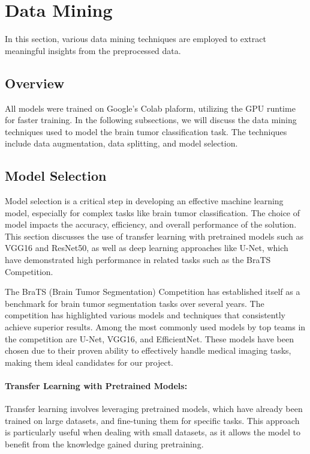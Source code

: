 \section{Data Mining}\label{data_mining}

In this section, various data mining techniques are employed to extract meaningful insights from the preprocessed data.

\subsection{Overview}\label{overview}

All models were trained on Google's Colab plaform, utilizing the GPU runtime for faster training. In the following subsections, we will discuss the data mining techniques used to model the brain tumor classification task. The techniques include data augmentation, data splitting, and model selection.

\subsection{Model Selection}\label{model_selection}

Model selection is a critical step in developing an effective machine learning model, especially for complex tasks like brain tumor classification. The choice of model impacts the accuracy, efficiency, and overall performance of the solution. This section discusses the use of transfer learning with pretrained models such as VGG16 and ResNet50, as well as deep learning approaches like U-Net, which have demonstrated high performance in related tasks such as the BraTS Competition.

The BraTS (Brain Tumor Segmentation) Competition has established itself as a benchmark for brain tumor segmentation tasks over several years. The competition has highlighted various models and techniques that consistently achieve superior results. Among the most commonly used models by top teams in the competition are U-Net, VGG16, and EfficientNet. These models have been chosen due to their proven ability to effectively handle medical imaging tasks, making them ideal candidates for our project.

\paragraph{Transfer Learning with Pretrained Models:}
Transfer learning involves leveraging pretrained models, which have already been trained on large datasets, and fine-tuning them for specific tasks. This approach is particularly useful when dealing with small datasets, as it allows the model to benefit from the knowledge gained during pretraining. 

